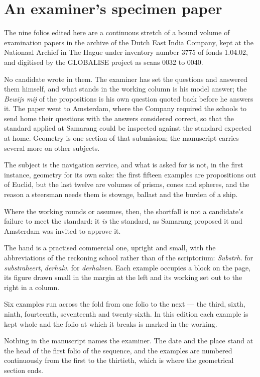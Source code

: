 \documentclass[11pt,twoside,openany]{book}
\begin{document}
\chapter*{An examiner's specimen paper}
The nine folios edited here are a continuous stretch of a bound volume of examination papers in the archive of the Dutch East India Company, kept at the Nationaal Archief in The Hague under inventory number 3775 of fonds 1.04.02, and digitised by the GLOBALISE project as scans 0032 to 0040.\par\vspace{8pt}
No candidate wrote in them. The examiner has set the questions and answered them himself, and what stands in the working column is his model answer; the \textit{Bewijs mij} of the propositions is his own question quoted back before he answers it. The paper went to Amsterdam, where the Company required the schools to send home their questions with the answers considered correct, so that the standard applied at Samarang could be inspected against the standard expected at home. Geometry is one section of that submission; the manuscript carries several more on other subjects.\par\vspace{8pt}
The subject is the navigation service, and what is asked for is not, in the first instance, geometry for its own sake: the first fifteen examples are propositions out of Euclid, but the last twelve are volumes of prisms, cones and spheres, and the reason a steersman needs them is stowage, ballast and the burden of a ship.\par\vspace{8pt}
Where the working rounds or assumes, then, the shortfall is not a candidate's failure to meet the standard: it \textit{is} the standard, as Samarang proposed it and Amsterdam was invited to approve it.\par\vspace{8pt}
The hand is a practised commercial one, upright and small, with the abbreviations of the reckoning school rather than of the scriptorium: \textit{Substrh.} for \textit{substraheert}, \textit{derhalv.} for \textit{derhalven}. Each example occupies a block on the page, its figure drawn small in the margin at the left and its working set out to the right in a column.\par\vspace{8pt}
Six examples run across the fold from one folio to the next --- the third, sixth, ninth, fourteenth, seventeenth and twenty-sixth. In this edition each example is kept whole and the folio at which it breaks is marked in the working.\par\vspace{8pt}
Nothing in the manuscript names the examiner. The date and the place stand at the head of the first folio of the sequence, and the examples are numbered continuously from the first to the thirtieth, which is where the geometrical section ends.
\end{document}
